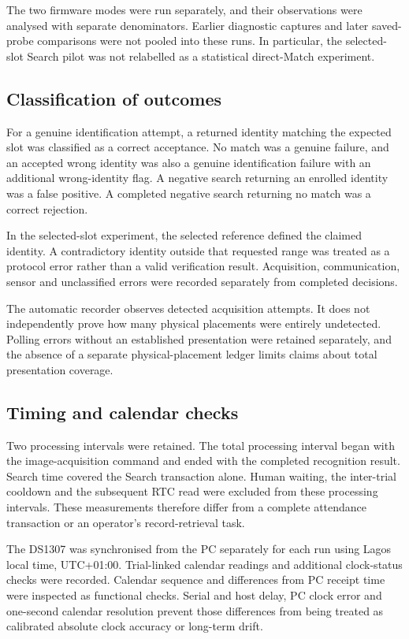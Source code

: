 The two firmware modes were run separately, and their observations were analysed with separate denominators. Earlier diagnostic captures and later saved-probe comparisons were not pooled into these runs. In particular, the selected-slot Search pilot was not relabelled as a statistical direct-Match experiment.

\subsection{Classification of outcomes}\label{sec:3-11-3}

For a genuine identification attempt, a returned identity matching the expected slot was classified as a correct acceptance. No match was a genuine failure, and an accepted wrong identity was also a genuine identification failure with an additional wrong-identity flag. A negative search returning an enrolled identity was a false positive. A completed negative search returning no match was a correct rejection.

In the selected-slot experiment, the selected reference defined the claimed identity. A contradictory identity outside that requested range was treated as a protocol error rather than a valid verification result. Acquisition, communication, sensor and unclassified errors were recorded separately from completed decisions.

The automatic recorder observes detected acquisition attempts. It does not independently prove how many physical placements were entirely undetected. Polling errors without an established presentation were retained separately, and the absence of a separate physical-placement ledger limits claims about total presentation coverage.

\subsection{Timing and calendar checks}\label{sec:3-11-4}

Two processing intervals were retained. The total processing interval began with the image-acquisition command and ended with the completed recognition result. Search time covered the Search transaction alone. Human waiting, the inter-trial cooldown and the subsequent RTC read were excluded from these processing intervals. These measurements therefore differ from a complete attendance transaction or an operator's record-retrieval task.

The DS1307 was synchronised from the PC separately for each run using Lagos local time, UTC+01:00. Trial-linked calendar readings and additional clock-status checks were recorded. Calendar sequence and differences from PC receipt time were inspected as functional checks. Serial and host delay, PC clock error and one-second calendar resolution prevent those differences from being treated as calibrated absolute clock accuracy or long-term drift.

